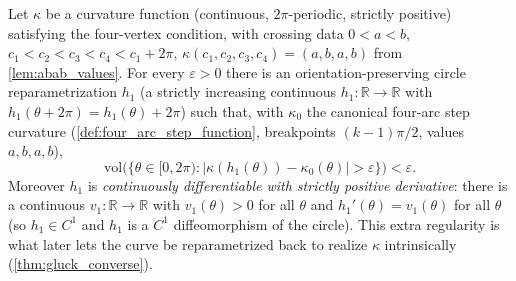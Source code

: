 \begin{lemma}

  \label{lem:exists_preliminary_reparam}
  Let $\kappa$ be a curvature function (continuous, $2\pi$-periodic, strictly
  positive) satisfying the four-vertex condition, with crossing data
  $0<a<b$, $c_1<c_2<c_3<c_4<c_1+2\pi$, $\kappa(c_1,c_2,c_3,c_4)=(a,b,a,b)$ from
  \cref{lem:abab_values}. For every $\varepsilon>0$ there is an orientation-preserving
  circle reparametrization $h_1$ (a strictly increasing continuous
  $h_1:\mathbb{R}\to\mathbb{R}$ with $h_1(\theta+2\pi)=h_1(\theta)+2\pi$) such that,
  with $\kappa_0$ the canonical four-arc step curvature
  (\cref{def:four_arc_step_function}, breakpoints $(k-1)\pi/2$, values $a,b,a,b$),
  \[
    \mathrm{vol}\bigl(\{\theta\in[0,2\pi): \lvert \kappa(h_1(\theta)) -
      \kappa_0(\theta)\rvert > \varepsilon\}\bigr) < \varepsilon .
  \]
  Moreover $h_1$ is \emph{continuously differentiable with strictly positive
  derivative}: there is a continuous $v_1:\mathbb{R}\to\mathbb{R}$ with
  $v_1(\theta)>0$ for all $\theta$ and $h_1'(\theta)=v_1(\theta)$ for all $\theta$
  (so $h_1\in C^1$ and $h_1$ is a $C^1$ diffeomorphism of the circle). This extra
  regularity is what later lets the curve be reparametrized back to realize
  $\kappa$ intrinsically (\cref{thm:gluck_converse}).
\end{lemma}
